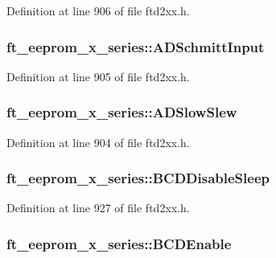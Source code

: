 Definition at line 906 of file ftd2xx.h.\hypertarget{structft__eeprom__x__series_addfb6cbf3c524edfbde9dbaf37f1f5e0}{
\subsubsection[{ADSchmittInput}]{ {\bf ft\_\-eeprom\_\-x\_\-series::ADSchmittInput}}}
\label{structft__eeprom__x__series_addfb6cbf3c524edfbde9dbaf37f1f5e0}


Definition at line 905 of file ftd2xx.h.\hypertarget{structft__eeprom__x__series_a3a1988ab68373c2fdc375cb4c038666f}{
\subsubsection[{ADSlowSlew}]{ {\bf ft\_\-eeprom\_\-x\_\-series::ADSlowSlew}}}
\label{structft__eeprom__x__series_a3a1988ab68373c2fdc375cb4c038666f}


Definition at line 904 of file ftd2xx.h.\hypertarget{structft__eeprom__x__series_ae65d73af8851dffca3c7a3f95af27196}{
\subsubsection[{BCDDisableSleep}]{ {\bf ft\_\-eeprom\_\-x\_\-series::BCDDisableSleep}}}
\label{structft__eeprom__x__series_ae65d73af8851dffca3c7a3f95af27196}


Definition at line 927 of file ftd2xx.h.\hypertarget{structft__eeprom__x__series_a168ac848d6e1e6b9e29b8740d20dbf2b}{
\subsubsection[{BCDEnable}]{ {\bf ft\_\-eeprom\_\-x\_\-series::BCDEnable}}}
\label{structft__eeprom__x__series_a168ac848d6e1e6b9e29b8740d20dbf2b}


